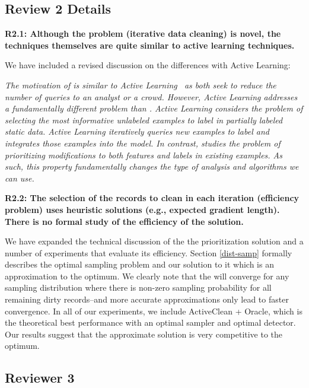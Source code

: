 \subsection*{Review 2 Details}

\noindent\textbf{R2.1: Although the problem (iterative data cleaning) is novel, the techniques themselves are quite similar to active learning techniques.}

\noindent  We have included a revised discussion on the differences with Active Learning:

\emph{The motivation of \sys is similar to Active Learning~\cite{DBLP:journals/pvldb/YakoutENOI11,gokhale2014corleone} as both seek to reduce the number of queries to an analyst or a crowd.
However, Active Learning addresses a fundamentally different problem than \sys.
Active Learning considers the problem of selecting the most informative unlabeled examples to label in partially labeled static data.
Active Learning iteratively queries new examples to label and integrates those examples into the model.
In contrast, \sys studies the problem of prioritizing modifications to both features and labels in existing examples.
As such, this property fundamentally changes the type of analysis and algorithms we can use.}

\vspace{0.5em}

\noindent\textbf{R2.2: The selection of the records to clean in each iteration (efficiency problem) uses heuristic solutions (e.g., expected gradient length). There is no formal study of the efficiency of the solution.}

\noindent  We have expanded the technical discussion of the the prioritization solution and a number of experiments that evaluate its efficiency. Section \ref{dist-samp} formally describes the optimal sampling problem and our solution to it which is an approximation to the optimum. We clearly note that the \sys will converge for any sampling distribution where there is non-zero sampling probability for all remaining dirty records--and more accurate approximations only lead to faster convergence. In all of our experiments, we include ActiveClean + Oracle, which is the theoretical best performance with an optimal sampler and optimal detector.
Our results suggest that the approximate solution is very competitive to the optimum. 

 \subsection*{Reviewer 3}

